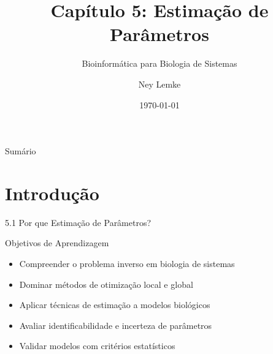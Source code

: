 


\title[Cap. 5: Estimação de Parâmetros]{Capítulo 5: Estimação de Parâmetros}
\subtitle{Bioinformática para Biologia de Sistemas}
\author{Ney Lemke}
\date{\today}



\begin{frame}
\titlepage
\end{frame}

\begin{frame}{Sumário}
\tableofcontents
\end{frame}

\section{Introdução}

\begin{frame}{5.1 Por que Estimação de Parâmetros?}
\begin{block}{Objetivos de Aprendizagem}
\begin{itemize}
    \item Compreender o problema inverso em biologia de sistemas
    \item Dominar métodos de otimização local e global
    \item Aplicar técnicas de estimação a modelos biológicos
    \item Avaliar identificabilidade e incerteza de parâmetros
    \item Validar modelos com critérios estatísticos
\end{itemize}
\end{block}

\vspace{0.3cm}

\end{frame}

